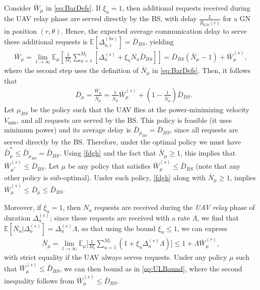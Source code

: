 \documentclass[12pt, draftcls, onecolumn]{IEEEtran}
\theoremstyle{plain}
\theoremstyle{definition}
\theoremstyle{remark}
\begin{document}
Consider $\bar{W}_{\mu}$ in \eqref{eq:BarDefs}. If $\xi_u{=}1$, then additional requests received during the UAV relay phase are served directly by the BS, with delay $\frac{L}{\bar{R}_{GB}(r)}$ for a GN in position $(r,\theta)$. Hence,
the expected average communication delay to serve these additional requests is
$\mathbb{E}[\Delta_{u,i}^{(bs)}]{=}\bar{D}_{BS}$, yielding
\begin{align}\label{eq:WBar}
    \bar{W}_{\mu} = \lim\limits_{t \rightarrow \infty} \mathbb{E}_{\mu} \left[ \frac{1}{M_t} \sum_{u = 1}^{M_t }[\Delta_u^{(s)}+\xi_u N_u\bar{D}_{BS}] \right]
    =
    \bar{D}_{BS}(\bar{N}_{\mu} -1)
    + \bar{W}_{\mu}^{(s)},
\end{align}
where the second step uses the definition of $\bar{N}_{\mu}$ in \eqref{eq:BarDefs}. Then, it follows that
\begin{align}\label{fdgh}
    &\bar{D}_{\mu}
    =\frac{\bar{W}_{\mu}}{\bar{N}_{\mu}}
    =\frac{1}{\bar N_{\mu}}\bar{W}_{\mu}^{(s)}
    +\left(1-\frac{1}{\bar N_{\mu}}\right)\bar{D}_{BS}.
\end{align}
Let $\mu_{BS}$ be the policy such that the UAV flies at the power-minimizing velocity $V_{\mathrm{min}}$, and all requests are served by the BS. This policy is feasible (it uses minimum power) and its average delay is $\bar{D}_{\mu_{BS}}{=}\bar{D}_{BS}$, since all requests are served directly by the BS. Therefore, under the optimal policy we must have $\bar{D}_{\mu}^{*}{\leq}\bar{D}_{\mu_{BS}}{=}\bar{D}_{BS}$. Using \eqref{fdgh} and the fact that $\bar{N}_{\mu}{\geq}1$, this implies that $\bar{W}_{\mu^{*}}^{(s)}{\leq}\bar{D}_{BS}$. Let $\mu$ be any policy that satisfies $\bar{W}_{\mu}^{(s)}{\leq}\bar{D}_{BS}$ (note that any other policy is sub-optimal). Under such policy, \eqref{fdgh} along with $\bar{N}_{\mu}{\geq}1$, implies $\bar{W}_{\mu}^{(s)}{\leq}\bar{D}_{\mu}{\leq}\bar{D}_{BS}$.

Moreover, if $\xi_{u}{=}1$, then $N_{u}$ requests are received during the \emph{UAV relay} phase of duration $\Delta_u^{(s)}$; since these requests are received with a rate $\Lambda$, we find that
$\mathbb{E}[N_{u}|\Delta_u^{(s)}]{=}\Delta_u^{(s)}\Lambda$, so that using the bound $\xi_{u}{\leq}1$, we can express
\begin{align}\label{eq:NBar}
	\bar{N}_{\mu} = \lim_{t \rightarrow \infty} \mathbb{E}_{\mu} \Bigg[ \frac{1}{M_t} \sum_{u = 1}^{M_t }(1+\xi_u\Delta_u^{(s)}\Lambda)\Bigg]
    \leq 1+\Lambda\bar{W}_{\mu}^{(s)},
\end{align}
with strict equality if the UAV always serves requests. Under any policy $\mu$ such that $\bar{W}_{\mu}^{(s)}{\leq}\bar{D}_{BS}$, we can then bound as in \eqref{eq:ULBound}, where the second inequality follows from $\bar{W}_{\mu}^{(s)}{\leq}\bar{D}_{BS}$.
\vspace{-4mm}
\end{document}

